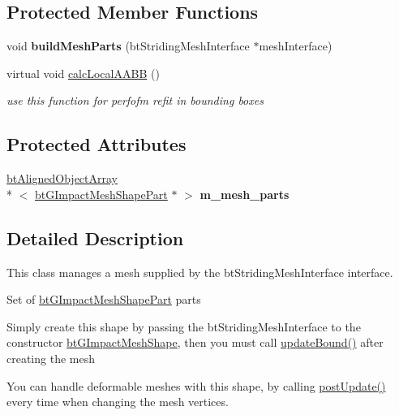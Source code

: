 \subsection*{Protected Member Functions}
\begin{DoxyCompactItemize}
\item 
\hypertarget{classbt_g_impact_mesh_shape_a97003b7f7d048c9fd8c8d281f0159311}{void {\bfseries build\+Mesh\+Parts} (bt\+Striding\+Mesh\+Interface $\ast$mesh\+Interface)}\label{classbt_g_impact_mesh_shape_a97003b7f7d048c9fd8c8d281f0159311}

\item 
\hypertarget{classbt_g_impact_mesh_shape_aa9273d609f4872c7a4c05e9873edbda8}{virtual void \hyperlink{classbt_g_impact_mesh_shape_aa9273d609f4872c7a4c05e9873edbda8}{calc\+Local\+A\+A\+B\+B} ()}\label{classbt_g_impact_mesh_shape_aa9273d609f4872c7a4c05e9873edbda8}

\begin{DoxyCompactList}\small\item\em use this function for perfofm refit in bounding boxes \end{DoxyCompactList}\end{DoxyCompactItemize}
\subsection*{Protected Attributes}
\begin{DoxyCompactItemize}
\item 
\hypertarget{classbt_g_impact_mesh_shape_adb3071a27a8d10e7e3ed3ad4cc966056}{\hyperlink{classbt_aligned_object_array}{bt\+Aligned\+Object\+Array}\\*
$<$ \hyperlink{classbt_g_impact_mesh_shape_part}{bt\+G\+Impact\+Mesh\+Shape\+Part} $\ast$ $>$ {\bfseries m\+\_\+mesh\+\_\+parts}}\label{classbt_g_impact_mesh_shape_adb3071a27a8d10e7e3ed3ad4cc966056}

\end{DoxyCompactItemize}


\subsection{Detailed Description}
This class manages a mesh supplied by the bt\+Striding\+Mesh\+Interface interface. 

Set of \hyperlink{classbt_g_impact_mesh_shape_part}{bt\+G\+Impact\+Mesh\+Shape\+Part} parts
\begin{DoxyItemize}
\item Simply create this shape by passing the bt\+Striding\+Mesh\+Interface to the constructor \hyperlink{classbt_g_impact_mesh_shape}{bt\+G\+Impact\+Mesh\+Shape}, then you must call \hyperlink{classbt_g_impact_shape_interface_acb26c2d7a2aecabd06b996b72b848492}{update\+Bound()} after creating the mesh
\item You can handle deformable meshes with this shape, by calling \hyperlink{classbt_g_impact_mesh_shape_afbf7ae3408bc0ab975c46ed65820a4b2}{post\+Update()} every time when changing the mesh vertices. 
\end{DoxyItemize}

